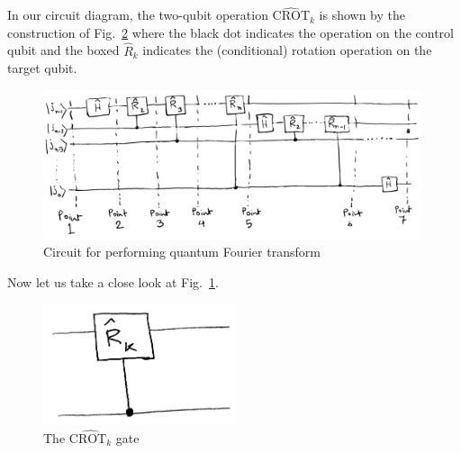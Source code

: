 \documentclass[12pt,oneside]{book}
\begin{document}
In our circuit diagram, the two-qubit operation $\hat{\mathrm{CROT}}_k$ is shown by the construction of Fig.~\ref{Fig.CROT_k} where the black dot indicates the operation on the control qubit and the boxed $\hat{R}_k$ indicates the (conditional) rotation operation on the target qubit.

\begin{figure}
    \centering
\includegraphics[width=0.99\textwidth]{QFT_schematic.png}
    \caption{Circuit for performing quantum Fourier transform}
    \label{QFT_circuit}
\end{figure}

Now let us take a close look at Fig.~\ref{QFT_circuit}.

\begin{figure}
    \centering   \includegraphics[width=0.5\textwidth]{CROT_gate.png}
    \caption{The $\hat{\mathrm{CROT}_k}$ gate}
    \label{Fig.CROT_k}
\end{figure}
\end{document}
